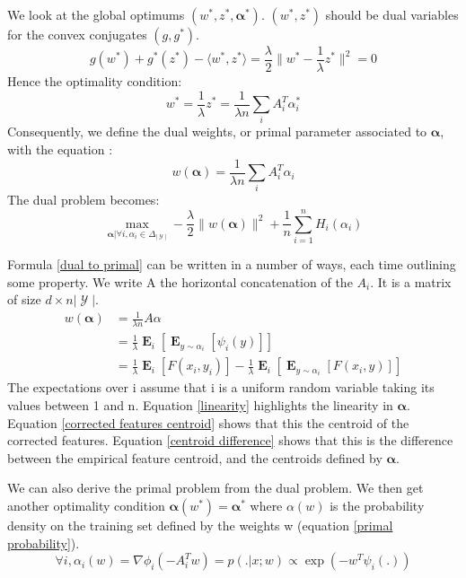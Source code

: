 \documentclass{article}
\DeclareMathOperator{\1}{\mathbb{1}}
\DeclareMathOperator{\E}{\mathbf{E}}
\DeclareMathOperator{\Y}{\mathcal{Y}}
\begin{document}
We look at the global optimums $(w^*,z^*,\bm\alpha^*)$.
$(w^*,z^*)$ should be dual variables for the convex conjugates $(g,g^*)$.
\begin{equation*}
	g(w^*) + g^*(z^*) - \langle w^*, z^* \rangle = \frac{\lambda}{2} \| w^* - \frac{1}{\lambda} z^* \|^2 = 0
\end{equation*}
Hence the optimality condition:
\begin{equation*}
	w^* = 	\frac{1}{\lambda} z^* =  \frac{1}{\lambda n} \sum_i A_i^T \alpha_i^*
\end{equation*}
Consequently, we define the dual weights, or primal parameter associated to $\bm \alpha$, with the equation :
\begin{equation}
	\label{dual to primal}
	w(\bm \alpha) =   \frac{1}{\lambda n} \sum_i A_i^T \alpha_i
\end{equation}
The dual problem becomes:
\begin{equation}
	\label{dual problem}
	\max_{\bm \alpha | \forall i, \alpha_i \in \Delta_{|\Y|}} -\frac{\lambda}{2} \| w(\bm \alpha) \|^2 + \frac{1}{n} \sum_{i=1}^n H_i(\alpha_i)
\end{equation}

Formula \ref{dual to primal} can be written in a number of ways, each time outlining some property.
We write A the horizontal concatenation of the $A_i$.
It is a matrix of size $d \times n|\Y|$.
\begin{align}
	w(\bm \alpha) & = \frac{1}{\lambda n} A \alpha \label{linearity} \\
	 & = \frac{1}{\lambda} \E_{i} [ \E_{y \sim \alpha_i} [\psi_i(y)]] \label{corrected features centroid} \\
	 & =   \frac{1}{\lambda} \E_{i} [F(x_i, y_i)] - \frac{1}{\lambda} \E_{i} [ \E_{y \sim \alpha_i} [F(x_i, y)]]
	 \label{centroid difference}
\end{align}
The expectations over i assume that i is a uniform random variable taking its values between 1 and n. 
Equation \ref{linearity} highlights the linearity in $\bm \alpha$. Equation \ref{corrected features centroid} shows that this the centroid of the corrected features. Equation \ref{centroid difference} shows that this is the difference between the empirical feature centroid, and the centroids defined by $\bm \alpha$.

We can also derive the primal problem from the dual problem.
We then get another optimality condition $\bm \alpha(w^*) = \bm \alpha^*$ where $\alpha(w)$ is the probability density on the training set defined by the weights w (equation \ref{primal probability}).
\begin{equation}
	\label{primal to dual}
	\forall i, \alpha_i(w) = \nabla\phi_i(-A_i^Tw) = p(.|x; w) \propto \exp(-w^T \psi_i(.))
\end{equation}
\end{document}
